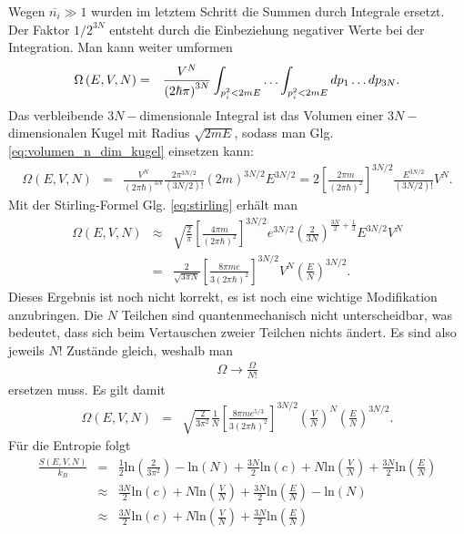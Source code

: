 \documentclass{book}
\newcommand\newoverline[1]{%
\overline{#1}}
\renewcommand{\ln}{\text{ln}}
\let\sum\relax
\DeclareMathOperator*{\sum}{\raisebox{-3.5pt}{\scalebox{2}{\rotatebox{1}{{\bask Σ}}}}}
\begin{document}
%
Wegen $\newoverline{n_i}\gg 1$ wurden im letztem Schritt die Summen durch Integrale ersetzt. Der Faktor $1/2^{3N}$ entsteht durch die Einbeziehung negativer Werte bei der Integration. Man kann weiter umformen
%
\begin{eqnarray}
\Omega\left(E, V, N\right) & = & \frac{V^N}{\left(2\hbar\pi\right)^{3N}}\int_{\sum p_i^2< 2mE}\dotsc\int_{\sum p_i^2<2mE} dp_1\dotsc dp_{3N}.
\end{eqnarray}
%
Das verbleibende $3N-$dimensionale Integral ist das Volumen einer $3N-$dimensionalen Kugel mit Radius $\sqrt{2mE}$, sodass man Glg. \eqref{eq:volumen_n_dim_kugel} einsetzen kann:
%
\begin{eqnarray}
\Omega\left(E, V, N\right) & = & \frac{V^N}{\left(2\pi\hbar\right)^{3N}}\frac{2\pi^{3N/2}}{\left(3N/2\right)!}\left(2m\right)^{3N/2}E^{3N/2} = 2\left[\frac{2\pi m}{\left(2\pi\hbar\right)^2}\right]^{3N/2}\frac{E^{3N/2}}{\left(3N/2\right)!}V^N.
\end{eqnarray}
%
Mit der Stirling-Formel Glg. \eqref{eq:stirling} erhält man
%
\begin{eqnarray}
\Omega\left(E, V, N\right)&\approx&\sqrt{\frac{2}{\pi}}\left[\frac{4\pi m}{\left(2\pi\hbar\right)^2}\right]^{3N/2}e^{3N/2}\left(\frac{2}{3N}\right)^{\frac{3N}{2} + \frac{1}{2}}E^{3N/2}V^N\nonumber\\
& = & \frac{2}{\sqrt{3\pi N}}\left[\frac{8\pi me}{3\left(2\pi\hbar\right)^2}\right]^{3N/2}V^N\left(\frac{E}{N}\right)^{3N/2}.
\end{eqnarray}
%
Dieses Ergebnis ist noch nicht korrekt, es ist noch eine wichtige Modifikation anzubringen. Die $N$ Teilchen sind quantenmechanisch nicht unterscheidbar, was bedeutet, dass sich beim Vertauschen zweier Teilchen nichts ändert. Es sind also jeweils $N!$ Zustände gleich, weshalb man
%
\begin{eqnarray}
\Omega\to\frac{\Omega}{N!}
\end{eqnarray}
%
ersetzen muss. Es gilt damit
%
\begin{eqnarray}
\Omega\left(E, V, N\right) & = & \sqrt{\frac{2}{3\pi^2}}\frac{1}{N}\left[\frac{8\pi me^{5/3}}{3\left(2\pi\hbar\right)^2}\right]^{3N/2}\left(\frac{V}{N}\right)^N\left(\frac{E}{N}\right)^{3N/2}.
\end{eqnarray}
%
Für die Entropie folgt
%
\begin{eqnarray}
\frac{S\left(E, V, N\right)}{k_B} & = & \frac{1}{2}\ln\left(\frac{2}{3\pi^2}\right) - \ln\left(N\right) + \frac{3N}{2}\ln\left(c\right) + N\ln\left(\frac{V}{N}\right) + \frac{3N}{2}\ln\left(\frac{E}{N}\right)\nonumber\\
&\approx&\frac{3N}{2}\ln\left(c\right) + N\ln\left(\frac{V}{N}\right) + \frac{3N}{2}\ln\left(\frac{E}{N}\right) - \ln\left(N\right)\nonumber\\
&\approx&\frac{3N}{2}\ln\left(c\right) + N\ln\left(\frac{V}{N}\right) + \frac{3N}{2}\ln\left(\frac{E}{N}\right)\label{eq:entropie_ideal}
\end{eqnarray}
\end{document}
